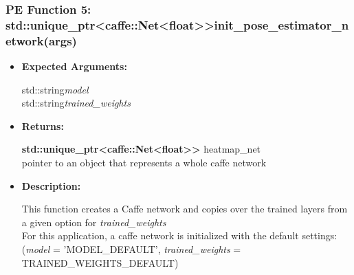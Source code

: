\documentclass{scrreprt}
\begin{document}
\subsubsection{PE Function 5: std::unique\_ptr\textless caffe::Net\textless float\textgreater\textgreater init\_pose\_estimator\_network(args)}
\begin{itemize}
    \item \textbf{Expected Arguments:}

    std::string\quad\textit{model}
    \\
    std::string\quad\textit{trained\_weights}

    \item \textbf{Returns:}

    \textbf{std::unique\_ptr\textless caffe::Net\textless float\textgreater\textgreater} heatmap\_net
    \\
    pointer to an object that represents a whole caffe network

    \item \textbf{Description:}

    This function creates a Caffe network and copies over the trained layers from a given option for \textit{trained\_weights}
    \\
    For this application, a caffe network is initialized with the default settings:
    \\
    (\textit{model} = 'MODEL\_DEFAULT', \textit{trained\_weights} = TRAINED\_WEIGHTS\_DEFAULT)
\end{itemize}
\end{document}
